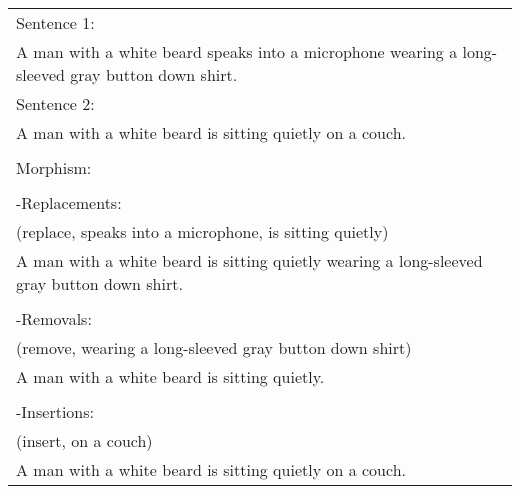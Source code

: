 \begin{tabular}{p{8cm}}
\hline
Sentence 1: \\
A man with a white beard speaks into a microphone wearing a long-sleeved gray button down shirt. \\ 
Sentence 2: \\
A man with a white beard is sitting quietly on a couch.\\ \\
Morphism:\\\\

-Replacements:\\
(replace, speaks into a microphone, is sitting quietly)\\ 
A man with a white beard is sitting quietly wearing a long-sleeved gray button down shirt. \\ \\
-Removals:\\
(remove, wearing a long-sleeved gray button down shirt) \\ 
A man with a white beard is sitting quietly.  \\ \\
-Insertions:\\
(insert, on a couch) \\ 
A man with a white beard is sitting quietly on a couch.\\

\hline
\end{tabular}